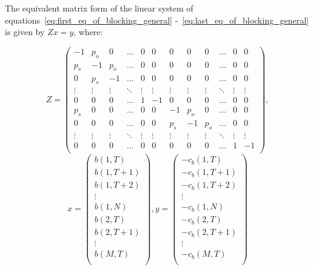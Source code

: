 The equivalent matrix form of the linear system of
equations~\eqref{eq:first_eq_of_blocking_general}
-~\eqref{eq:last_eq_of_blocking_general}
is given by \(Zx=y\), where:

\newcommand{\secondallthedots}{\vdots & \vdots & \vdots & \ddots & \vdots & \vdots &
\vdots & \vdots & \vdots & \ddots & \vdots & \vdots}

\begin{equation}
    Z =
    \begin{pmatrix}
        -1 & p_o & 0 & \dots & 0 & 0 & 0 & 0 & 0 & \dots & 0 & 0 \\ %
        p_s & -1 & p_o & \dots & 0 & 0 & 0 & 0 & 0 & \dots & 0 & 0 \\ %
        0 & p_s & -1 & \dots & 0 & 0 & 0 & 0 & 0 & \dots & 0 & 0 \\ %
        \secondallthedots \\
        0 & 0 & 0 & \dots & 1 & -1 & 0 & 0 & 0 & \dots & 0 & 0 \\ %
        p_s & 0 & 0 & \dots & 0 & 0 & -1 & p_o & 0 & \dots & 0 & 0 \\ %
        0 & 0 & 0 & \dots & 0 & 0 & p_s & -1 & p_o & \dots & 0 & 0 \\ %
        \secondallthedots \\
        0 & 0 & 0 & \dots & 0 & 0 & 0 & 0 & 0 & \dots & 1 & -1 \\ %
    \end{pmatrix},
\end{equation}
\begin{equation}\label{eq:general_direct_approach_blocking_time}
    x =
    \begin{pmatrix}
        b(1,T) \\
        b(1,T+1) \\
        b(1,T+2) \\
        \vdots \\
        b(1,N) \\
        b(2,T) \\
        b(2,T+1) \\
        \vdots \\
        b(M,T) \\
    \end{pmatrix},
    y=
    \begin{pmatrix}
        -c_b(1,T) \\
        -c_b(1,T+1) \\
        -c_b(1,T+2) \\
        \vdots \\
        -c_b(1,N) \\
        -c_b(2,T) \\
        -c_b(2,T+1) \\
        \vdots \\
        -c_b(M,T) \\
    \end{pmatrix}
\end{equation}

